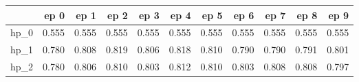 \begin{tabular}{lrrrrrrrrrr}
\toprule
{} &   ep 0 &   ep 1 &   ep 2 &   ep 3 &   ep 4 &   ep 5 &   ep 6 &   ep 7 &   ep 8 &   ep 9 \\
\midrule
hp\_0 &  0.555 &  0.555 &  0.555 &  0.555 &  0.555 &  0.555 &  0.555 &  0.555 &  0.555 &  0.555 \\
hp\_1 &  0.780 &  0.808 &  0.819 &  0.806 &  0.818 &  0.810 &  0.790 &  0.790 &  0.791 &  0.801 \\
hp\_2 &  0.780 &  0.806 &  0.810 &  0.803 &  0.812 &  0.810 &  0.803 &  0.808 &  0.808 &  0.797 \\
\bottomrule
\end{tabular}
